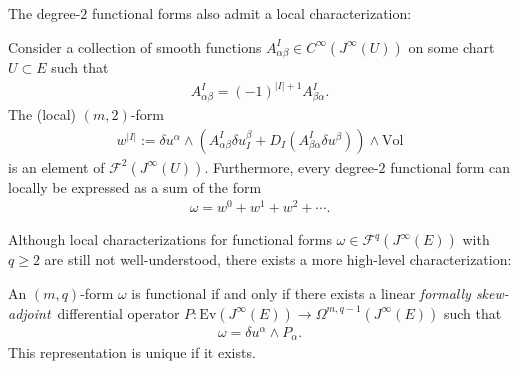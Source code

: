     The degree-$2$ functional forms also admit a local characterization:
    \begin{property}
        Consider a collection of smooth functions $A^I_{\alpha\beta}\in C^\infty(J^\infty(U))$ on some chart $U\subset E$ such that
        \begin{gather}
            A^I_{\alpha\beta} = (-1)^{|I|+1}A^I_{\beta\alpha}.
        \end{gather}
        The (local) $(m,2)$-form
        \begin{gather}
            w^{|I|} := \delta u^\alpha\wedge\left(A^I_{\alpha\beta}\delta u^\beta_I + D_I(A^I_{\beta\alpha}\delta u^\beta)\right)\wedge\text{Vol}
        \end{gather}
        is an element of $\mathcal{F}^2(J^\infty(U))$. Furthermore, every degree-$2$ functional form can locally be expressed as a sum of the form
        \begin{gather}
            \omega = w^0 + w^1 + w^2 + \cdots.
        \end{gather}
    \end{property}

    Although local characterizations for functional forms $\omega\in\mathcal{F}^q(J^\infty(E))$ with $q\geq2$ are still not well-understood, there exists a more high-level characterization:
    \begin{property}
        An $(m,q)$-form $\omega$ is functional if and only if there exists a linear \textit{formally skew-adjoint}\footnotemark\ differential operator $P:\text{Ev}(J^\infty(E))\rightarrow\Omega^{m,q-1}(J^\infty(E))$ such that
        \begin{gather}
            \omega = \delta u^\alpha\wedge P_\alpha.
        \end{gather}
        This representation is unique if it exists.
    \end{property}

